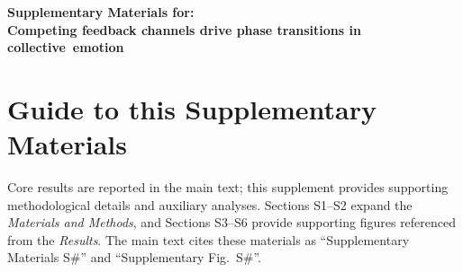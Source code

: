 \documentclass[11pt]{article}
\begin{document}
\linenumbers %

\begin{center}
{\LARGE\bfseries Supplementary Materials for:\\
Competing feedback channels drive phase transitions in collective~emotion}
\end{center}

\vspace{1em}

\renewcommand{\contentsname}{Supplementary Contents}
\setcounter{tocdepth}{2}
\tableofcontents
\clearpage
\FloatBarrier

\section*{Guide to this Supplementary Materials}
Core results are reported in the main text; this supplement provides supporting methodological details and auxiliary analyses. Sections S1--S2 expand the \emph{Materials and Methods}, and Sections S3--S6 provide supporting figures referenced from the \emph{Results}. The main text cites these materials as ``Supplementary Materials S\#'' and ``Supplementary Fig.~S\#''.
\end{document}
